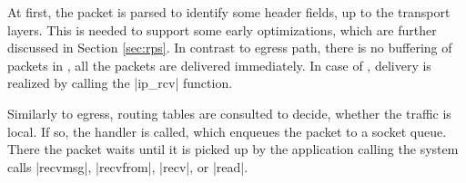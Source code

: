 At first, the packet is parsed to identify some header fields, up to the
transport layers. This is needed to support some early optimizations, which are
further discussed in Section \ref{sec:rps}. In contrast to egress path, there
is no buffering of packets in , all the packets are delivered
immediately. In case of , delivery is realized by calling the
\fnc|ip_rcv| function.

Similarly to egress, routing tables are consulted to decide, whether the
traffic is local. If so, the  handler is called, which enqueues the
packet to a socket queue. There the packet waits until it is picked up by the
application calling the system calls \fnc|recvmsg|, \fnc|recvfrom|, \fnc|recv|,
or \fnc|read|.
